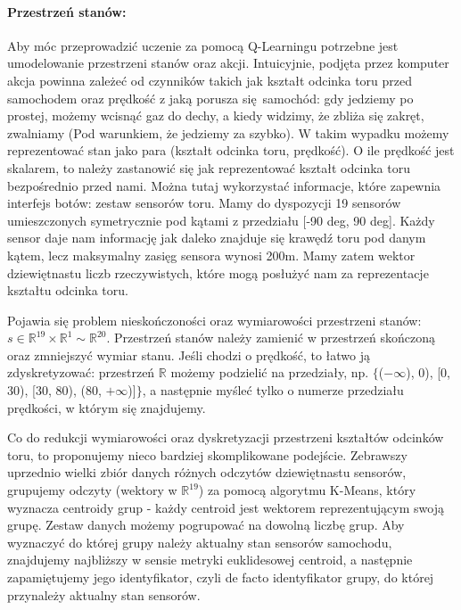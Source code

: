 \documentclass{article}
\begin{document}
\paragraph{Przestrzeń stanów:}
Aby móc przeprowadzić uczenie za pomocą Q-Learningu potrzebne jest umodelowanie przestrzeni stanów oraz akcji. Intuicyjnie, podjęta przez komputer akcja powinna zależeć od czynników takich jak kształt odcinka toru przed samochodem oraz prędkość z jaką porusza się samochód: gdy jedziemy po prostej, możemy wcisnąć gaz do dechy, a kiedy widzimy, że zbliża się zakręt, zwalniamy (Pod warunkiem, że jedziemy za szybko). W takim wypadku możemy reprezentować stan jako para (kształt odcinka toru, prędkość). O ile prędkość jest skalarem, to należy zastanowić się jak reprezentować kształt odcinka toru bezpośrednio przed nami. Można tutaj wykorzystać informacje, które zapewnia interfejs botów: zestaw sensorów toru. Mamy do dyspozycji 19 sensorów umieszczonych symetrycznie pod kątami z przedziału [-90 deg, 90 deg]. Każdy sensor daje nam informację jak daleko znajduje się krawędź toru pod danym kątem, lecz maksymalny zasięg sensora wynosi 200m. Mamy zatem wektor dziewiętnastu liczb rzeczywistych, które mogą posłużyć nam za reprezentacje kształtu odcinka toru. 

Pojawia się problem nieskończoności oraz wymiarowości przestrzeni stanów: $s \in \mathbb{R}^{19} \times \mathbb{R}^{1} \sim \mathbb{R}^{20}$. Przestrzeń stanów należy zamienić w przestrzeń skończoną oraz zmniejszyć wymiar stanu. Jeśli chodzi o prędkość, to łatwo ją zdyskretyzować: przestrzeń $\mathbb{R}$ możemy podzielić na przedziały, np. $\{$($-\infty$), 0), [0, 30), [30, 80), (80, $+\infty$)]$\}$, a następnie myśleć tylko o numerze przedziału prędkości, w którym się znajdujemy.

Co do redukcji wymiarowości oraz dyskretyzacji przestrzeni kształtów odcinków toru, to proponujemy nieco bardziej skomplikowane podejście. Zebrawszy uprzednio wielki zbiór danych różnych odczytów dziewiętnastu sensorów, grupujemy odczyty (wektory w $\mathbb{R}^{19}$) za pomocą algorytmu K-Means, który wyznacza centroidy grup - każdy centroid jest wektorem reprezentującym swoją grupę. Zestaw danych możemy pogrupować na dowolną liczbę grup. Aby wyznaczyć do której grupy należy aktualny stan sensorów samochodu, znajdujemy najbliższy w sensie metryki euklidesowej centroid, a następnie zapamiętujemy jego identyfikator, czyli de facto identyfikator grupy, do której przynależy aktualny stan sensorów.
\end{document}
